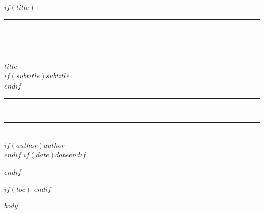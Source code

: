 \documentclass[
  $if(fontsize)$$fontsize$$else$12pt$endif$,
  a4paper,
  oneside,
  openany
]{book}
\begin{document}
$if(title)$
\begin{titlepage}
  \thispagestyle{empty}
  \vspace*{\fill}
  \begin{center}
    \noindent\rule{\textwidth}{2.2pt}\\[-1pt]
    \noindent\rule{\textwidth}{0.5pt}\\[2.5em]
    {\fontsize{52}{62}\selectfont\bfseries $title$}\\[2em]
    $if(subtitle)${\Large\itshape $subtitle$}\\[1.5em]$endif$
    \noindent\rule{\textwidth}{0.5pt}\\[-1pt]
    \noindent\rule{\textwidth}{2.2pt}\\[2.5em]
    $if(author)${\large $author$}\\[0.8em]$endif$
    $if(date)${\small $date$}$endif$
  \end{center}
  \vspace*{\fill}
\end{titlepage}
$endif$

$if(toc)$
{
  \setlength{\parskip}{2pt}
  \tableofcontents
  \clearpage
}
$endif$

$body$
\end{document}
